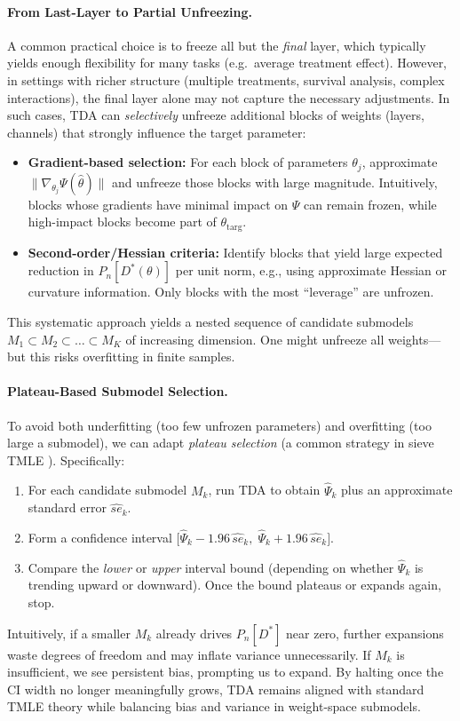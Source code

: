 \documentclass{article}
\theoremstyle{remark}
\begin{document}
\paragraph{From Last-Layer to Partial Unfreezing.}
A common practical choice is to freeze all but the \emph{final} layer, which typically yields enough flexibility for many tasks (e.g.\ average treatment effect). However, in settings with richer structure (multiple treatments, survival analysis, complex interactions), the final layer alone may not capture the necessary adjustments.  In such cases, TDA can \emph{selectively} unfreeze additional blocks of weights (layers, channels) that strongly influence the target parameter:
\begin{itemize}[leftmargin=1em]
\item \textbf{Gradient-based selection:} For each block of parameters $\theta_{j}$, approximate 
\(\bigl\|\nabla_{\theta_j}\Psi(\hat{\theta})\bigr\|\)
and unfreeze those blocks with large magnitude.  Intuitively, blocks whose gradients have minimal impact on $\Psi$ can remain frozen, while high-impact blocks become part of $\theta_{\text{targ}}$.
\item \textbf{Second-order/Hessian criteria:} Identify blocks that yield large expected reduction in $P_n[D^*(\theta)]$ per unit norm, e.g., using approximate Hessian or curvature information.  Only blocks with the most ``leverage'' are unfrozen.
\end{itemize}
This systematic approach yields a nested sequence of candidate submodels $M_1\subset M_2\subset\dots\subset M_K$ of increasing dimension. One might unfreeze all weights---but this risks overfitting in finite samples.

\paragraph{Plateau-Based Submodel Selection.}
To avoid both underfitting (too few unfrozen parameters) and overfitting (too large a submodel), we can adapt \emph{plateau selection} (a common strategy in sieve TMLE \cite{davies2014sieve}).  Specifically:
\begin{enumerate}[leftmargin=1em,itemsep=0pt]
\item For each candidate submodel $M_k$, run TDA to obtain $\widehat{\Psi}_k$ plus an approximate standard error $\widehat{se}_k$.
\item Form a confidence interval $\bigl[\widehat{\Psi}_k - 1.96\,\widehat{se}_k,\;\widehat{\Psi}_k + 1.96\,\widehat{se}_k\bigr]$.
\item Compare the \emph{lower} or \emph{upper} interval bound (depending on whether $\widehat{\Psi}_k$ is trending upward or downward).  Once the bound plateaus or expands again, stop.
\end{enumerate}
Intuitively, if a smaller $M_k$ already drives $P_n[D^*]$ near zero, further expansions waste degrees of freedom and may inflate variance unnecessarily.  If $M_k$ is insufficient, we see persistent bias, prompting us to expand.  By halting once the CI width no longer meaningfully grows, TDA remains aligned with standard TMLE theory while balancing bias and variance in weight-space submodels.
\end{document}
